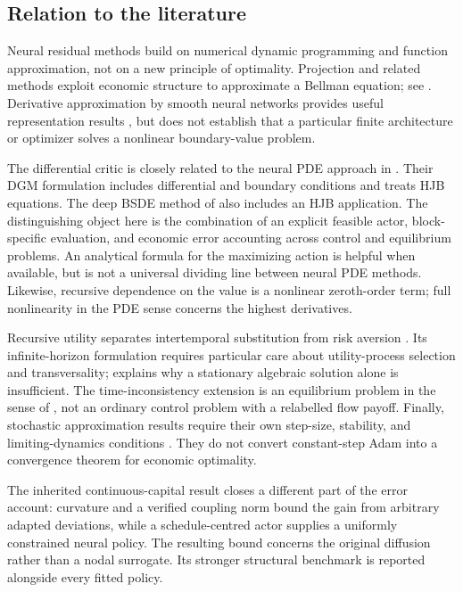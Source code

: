 \documentclass[ecta,nameyear,draft]{econsocart}
\theoremstyle{definition}
\theoremstyle{remark}
\begin{document}
\subsection{Relation to the literature}
Neural residual methods build on numerical dynamic programming and function approximation, not on a new principle of optimality. Projection and related methods exploit economic structure to approximate a Bellman equation; see \citet{judd1998}. Derivative approximation by smooth neural networks provides useful representation results \citep{hornik1990}, but does not establish that a particular finite architecture or optimizer solves a nonlinear boundary-value problem.

The differential critic is closely related to the neural PDE approach in \citet{sirignano2018}. Their DGM formulation includes differential and boundary conditions and treats HJB equations. The deep BSDE method of \citet{han2018} also includes an HJB application. The distinguishing object here is the combination of an explicit feasible actor, block-specific evaluation, and economic error accounting across control and equilibrium problems. An analytical formula for the maximizing action is helpful when available, but is not a universal dividing line between neural PDE methods. Likewise, recursive dependence on the value is a nonlinear zeroth-order term; full nonlinearity in the PDE sense concerns the highest derivatives.

Recursive utility separates intertemporal substitution from risk aversion \citep{epsteinzin1989,duffieepstein1992}. Its infinite-horizon formulation requires particular care about utility-process selection and transversality; \citet{herdegen2021} explains why a stationary algebraic solution alone is insufficient. The time-inconsistency extension is an equilibrium problem in the sense of \citet{bjork2016}, not an ordinary control problem with a relabelled flow payoff. Finally, stochastic approximation results require their own step-size, stability, and limiting-dynamics conditions \citep{borkar2024}. They do not convert constant-step Adam into a convergence theorem for economic optimality.

The inherited continuous-capital result closes a different part of the error account: curvature and a verified coupling norm bound the gain from arbitrary adapted deviations, while a schedule-centred actor supplies a uniformly constrained neural policy. The resulting bound concerns the original diffusion rather than a nodal surrogate. Its stronger structural benchmark is reported alongside every fitted policy.
\end{document}
